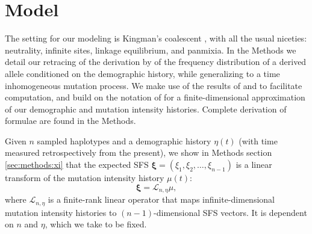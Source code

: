 \documentclass[11pt]{article}
\begin{document}

\section{Model}\label{sec:model}

The setting for our modeling is Kingman's coalescent \citep{Kingman1982-ge, Kingman1982-tf, Kingman1982-ys, Kingman2000-jr}, with all the usual niceties: neutrality, infinite sites, linkage equilibrium, and panmixia.
In the Methods we detail our retracing of the derivation by \cite{Griffiths1998-qf} of the frequency distribution of a derived allele conditioned on the demographic history, while generalizing to a time inhomogeneous mutation process.
We make use of the results of \cite{Polanski2003-kg} and \cite{Polanski2003-ll} to facilitate computation, and build on the notation of \cite{Rosen2018-bb} for a finite-dimensional approximation of our demographic and mutation intensity histories.
Complete derivation of formulae are found in the Methods.

Given $n$ sampled haplotypes and a demographic history $\eta(t)$ (with time measured retrospectively from the present), we show in Methods section \ref{sec:methods:xi} that the expected SFS $\boldsymbol \xi = (\xi_1, \xi_2,\dots, \xi_{n-1})$ is a linear transform of the mutation intensity history $\mu(t)$:
\begin{equation}
  \label{eqn:transform}
\boldsymbol \xi = \mathcal{L}_{n,\eta}\mu,
\end{equation}
where $\mathcal{L}_{n,\eta}$ is a finite-rank linear operator that maps infinite-dimensional mutation intensity histories to $(n-1)$-dimensional SFS vectors.
It is dependent on $n$ and $\eta$, which we take to be fixed.

\end{document}
